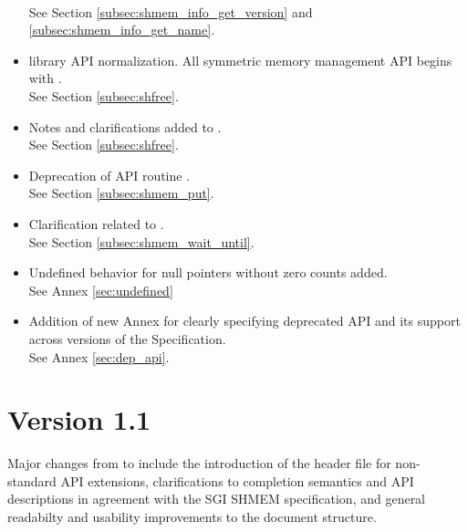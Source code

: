 \begin{itemize}
\\See Section \ref{subsec:shmem_info_get_version} and \ref{subsec:shmem_info_get_name}.
%
\item \openshmem library API normalization. All \Cstd symmetric memory management
      API begins with  .
\\See Section \ref{subsec:shfree}.
%
\item Notes and clarifications added to .
\\See Section \ref{subsec:shfree}.
%
\item Deprecation of \Fortran API routine .
\\See Section \ref{subsec:shmem_put}.
%
\item Clarification related to .
\\See Section \ref{subsec:shmem_wait_until}.
%
\item Undefined behavior for null pointers without zero counts added.
\\See Annex \ref{sec:undefined}
%
\item Addition of new Annex for clearly specifying deprecated API and its
      support across versions of the \openshmem Specification.
\\See Annex \ref{sec:dep_api}.
%
\end{itemize}




\section{Version 1.1}
Major changes from \openshmem[1.0] to \openshmem[1.1] include
the introduction of the  header file for non-standard API
extensions,
clarifications to completion semantics and API descriptions in agreement with
the \ac{SGI} SHMEM specification,
and general readabilty and usability improvements to the document structure.

